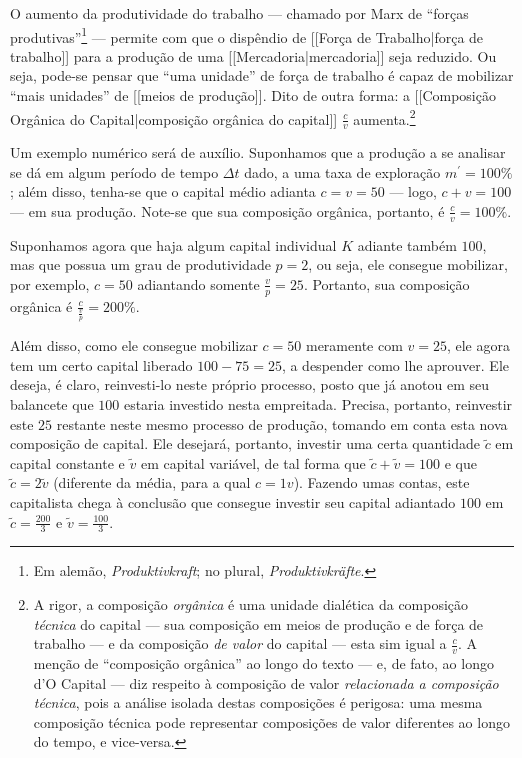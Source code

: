 O aumento da produtividade do trabalho — chamado por Marx de ``forças produtivas''\footnote{Em alemão, \textit{Produktivkraft}; no plural, \textit{Produktivkräfte}.} — permite com que o dispêndio de [[Força de Trabalho|força de trabalho]] para a produção de uma [[Mercadoria|mercadoria]] seja reduzido. Ou seja, pode-se pensar que ``uma unidade'' de força de trabalho é capaz de mobilizar ``mais unidades'' de [[meios de produção]]. Dito de outra forma: a [[Composição Orgânica do Capital|composição orgânica do capital]] $\frac{c}{v}$ aumenta.\footnote{A rigor, a composição \textit{orgânica} é uma unidade dialética da composição \textit{técnica} do capital — sua composição em meios de produção e de força de trabalho — e da composição \textit{de valor} do capital — esta sim igual a $\frac{c}{v}$. A menção de ``composição orgânica'' ao longo do texto — e, de fato, ao longo d'O Capital — diz respeito à composição de valor \textit{relacionada a composição técnica}, pois a análise isolada destas composições é perigosa: uma mesma composição técnica pode representar composições de valor diferentes ao longo do tempo, e vice-versa.}

Um exemplo numérico será de auxílio. Suponhamos que a produção a se analisar se dá em algum período de tempo $\Delta t$ dado, a uma taxa de exploração $m^{\prime}=100\%$; além disso, tenha-se que o capital médio adianta $c=v=50$ — logo, $c+v=100$ — em sua produção. Note-se que sua composição orgânica, portanto, é $\frac{c}{v}=100\%$.

Suponhamos agora que haja algum capital individual $K$ adiante também $100$, mas que possua um grau de produtividade $p=2$, ou seja, ele consegue mobilizar, por exemplo, $c=50$ adiantando somente $\frac{v}{p}=25$. Portanto, sua composição orgânica é $\frac{c}{\frac{v}{p}}=200\%$. 

Além disso, como ele consegue mobilizar $c=50$ meramente com $v=25$, ele agora tem um certo capital liberado $100-75=25$, a despender como lhe aprouver. Ele deseja, é claro, reinvesti-lo neste próprio processo, posto que já anotou em seu balancete que $100$ estaria investido nesta empreitada. Precisa, portanto, reinvestir este $25$ restante neste mesmo processo de produção, tomando em conta esta nova composição de capital. Ele desejará, portanto, investir uma certa quantidade $\tilde{c}$ em capital constante e $\tilde{v}$ em capital variável, de tal forma que $\tilde{c}+\tilde{v}=100$ e que $\tilde{c} = 2 \tilde{v}$ (diferente da média, para a qual $c=1v$). Fazendo umas contas, este capitalista chega à conclusão que consegue investir seu capital adiantado $100$ em $\tilde{c}=\frac{200}{3}$ e $\tilde{v}=\frac{100}{3}$.

